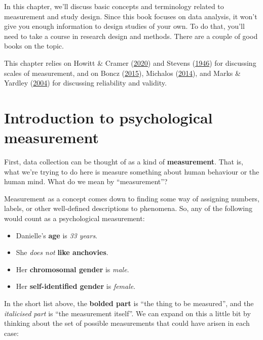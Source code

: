 \documentclass[
  11pt,
]{book}
\providecommand{\tightlist}{%
  \setlength{\itemsep}{0pt}\setlength{\parskip}{0pt}}
\theoremstyle{definition}
\theoremstyle{definition}
\theoremstyle{definition}
\theoremstyle{definition}
\theoremstyle{remark}
\begin{document}
In this chapter, we'll discuss basic concepts and terminology related to measurement and study design. Since this book focuses on data analysis, it won't give you enough information to design studies of your own. To do that, you'll need to take a course in research design and methods. There are a couple of good books on the topic.

This chapter relies on Howitt \& Cramer (\protect\hyperlink{ref-howittUnderstandingStatisticsPsychology2020}{2020}) and Stevens (\protect\hyperlink{ref-Stevens1946}{1946}) for discussing scales of measurement, and on Boncz (\protect\hyperlink{ref-bonczResearchMethodologyBasics2015}{2015}), Michalos (\protect\hyperlink{ref-michalosEncyclopediaQualityLife2014}{2014}), and Marks \& Yardley (\protect\hyperlink{ref-marksResearchMethodsClinical2004}{2004}) for discussing reliability and validity.

\hypertarget{measurement}{%
\section{Introduction to psychological measurement}\label{measurement}}

First, data collection can be thought of as a kind of \textbf{measurement}. That is, what we're trying to do here is measure something about human behaviour or the human mind. What do we mean by ``measurement''?

Measurement as a concept comes down to finding some way of assigning numbers, labels, or other well-defined descriptions to phenomena. So, any of the following would count as a psychological measurement:

\begin{itemize}
\tightlist
\item
  Danielle's \textbf{age} is \emph{33 years}.
\item
  She \emph{does not} \textbf{like anchovies}.
\item
  Her \textbf{chromosomal gender} is \emph{male}.
\item
  Her \textbf{self-identified gender} is \emph{female}.
\end{itemize}

In the short list above, the \textbf{bolded part} is ``the thing to be measured'', and the \emph{italicised part} is ``the measurement itself''. We can expand on this a little bit by thinking about the set of possible measurements that could have arisen in each case:
\end{document}
